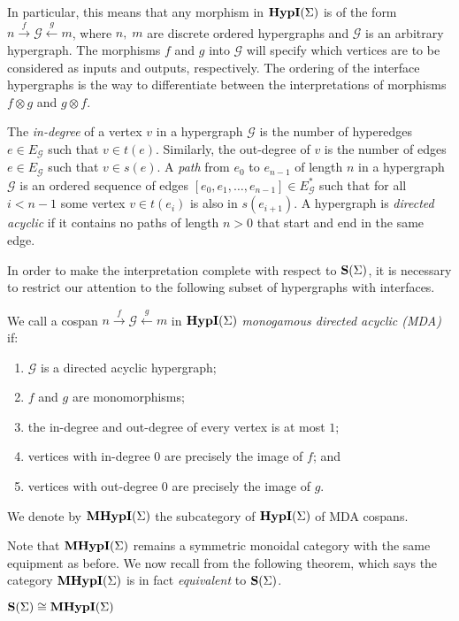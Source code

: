 In particular, this means that any morphism in $\textbf{HypI}(\Sigma)$ is of the form $n \xrightarrow{f} \mathcal{G} \xleftarrow{g} m$,
where $n,\;m$ are discrete ordered hypergraphs and $\mathcal{G}$ is an arbitrary hypergraph.  The morphisms $f$ and $g$ into $\mathcal{G}$ will specify which vertices are to be considered as inputs and outputs,  respectively.
The ordering of the interface hypergraphs is the way to differentiate between the interpretations of morphisms $f \otimes g$ and $g \otimes f$.

\begin{definition} 
The \emph{in-degree} of a vertex $v$ in a hypergraph $\mathcal{G}$ is the number of hyperedges $e \in {E_\mathcal{G}}$ such that $v \in t(e)$.  
Similarly, the out-degree of $v$ is the number of edges $e \in E_\mathcal{G}$ such that $v \in s(e)$.
A \emph{path} from $e_0$ to $e_{n-1}$ of length $n$ in a hypergraph $\mathcal{G}$ is an ordered sequence of edges $[e_0, e_1, \ldots, e_{n-1}] \in E_\mathcal{G}^*$ such that for all $i < n - 1$ some vertex $v \in t(e_i)$ is also in $s(e_{i+1})$.
A hypergraph is \emph{directed acyclic} if it contains no paths of length $n > 0$ that start and end in the same edge.
\end{definition}

In order to make the interpretation complete with respect to $\mathbf{S}(\Sigma)$,  it is necessary to restrict our attention to the following subset of hypergraphs with interfaces. 
\begin{definition}
\label{def:monogamy_hyp}
We call a cospan $n \xrightarrow{f} \mathcal{G} \xleftarrow{g} m$ in $\textbf{HypI}(\Sigma)$ \emph{monogamous directed acyclic (MDA)} if:
\begin{enumerate}
    \item $\mathcal{G}$ is a directed acyclic hypergraph;
    \item $f$ and $g$ are monomorphisms;
    \item the in-degree and out-degree of every vertex is at most $1$;
    \item vertices with in-degree $0$ are precisely the image of $f$; and
    \item vertices with out-degree $0$ are precisely the image of $g$.
\end{enumerate}
We denote by $\textbf{MHypI}(\Sigma)$ the subcategory of $\textbf{HypI}(\Sigma)$ of MDA cospans.
\end{definition}
Note that $\textbf{MHypI}(\Sigma)$ remains a symmetric monoidal category with the same equipment as before.  We now recall from
\cite{bonchi_string_2022-2} the following theorem,  which says the category $\textbf{MHypI}(\Sigma)$ is in fact \textit{equivalent} to $\mathbf{S}(\Sigma)$. 
\begin{theorem}\label{thm:prop-equiv}
    $\mathbf{S}(\Sigma) \cong \textbf{MHypI}(\Sigma)$
\end{theorem}

